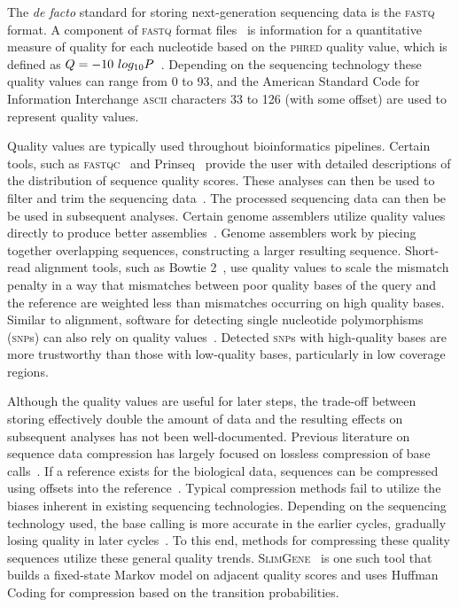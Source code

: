 \documentclass{bioinfo}
\begin{document}
The \emph{de facto} standard for storing next-generation sequencing data is the \textsc{fastq} format. A component of \textsc{fastq} format files~\cite{cock2010sanger} is information for a quantitative measure of quality for each nucleotide based on the \textsc{phred} quality value, which is defined as $Q = -10\ log_{10}\/P$~\cite{ewing1998base}. Depending on the sequencing technology these quality values can range from 0 to 93, and the American Standard Code for Information Interchange \textsc{ascii} characters 33 to 126 (with some offset) are used to represent quality values.

Quality values are typically used throughout bioinformatics pipelines.
Certain tools, such as \textsc{fastqc}~\cite{andrews2010fastqc} and Prinseq~\cite{schmieder2011quality}  provide the user with detailed descriptions of the distribution of sequence quality scores. These analyses can then be used to filter and trim the sequencing data~\cite{martin2011cutadapt}.
The processed sequencing data can then be be used in subsequent analyses.
Certain genome assemblers utilize quality values directly to produce better assemblies~\cite{gnerre2011high}. Genome assemblers work by piecing together overlapping sequences, constructing a larger resulting sequence. Short-read alignment tools, such as Bowtie 2~\cite{langmead2012fast}, use quality values to scale the mismatch penalty in a way that mismatches between poor quality bases of the query and the reference are weighted less than mismatches occurring on high quality bases. Similar to alignment, software for detecting single nucleotide polymorphisms (\textsc{snp}s) can also rely on quality values~\cite{mckenna2010genome}. Detected \textsc{snp}s with high-quality bases are more trustworthy than those with low-quality bases, particularly in low coverage regions.

Although the quality values are useful for later steps, the trade-off between storing effectively double the amount of data and the resulting effects on subsequent analyses has not been well-documented. Previous literature on sequence data compression has largely focused on lossless compression of base calls~\cite{sato2001dna,chen2000compression,chen2002dnacompress}. If a reference exists for the biological data, sequences can be compressed using offsets into the reference~\cite{kozanitis2011compressing}. Typical compression methods fail to utilize the biases inherent in existing sequencing technologies. Depending on the sequencing technology used, the base calling is more accurate in the earlier cycles, gradually losing quality in later cycles~\cite{kozanitis2011compressing}.
To this end, methods for compressing these quality sequences utilize these general quality trends. \textsc{SlimGene}~\cite{kozanitis2011compressing} is one such tool that builds a fixed-state Markov model on adjacent quality scores and uses Huffman Coding for compression based on the transition probabilities.
\end{document}
